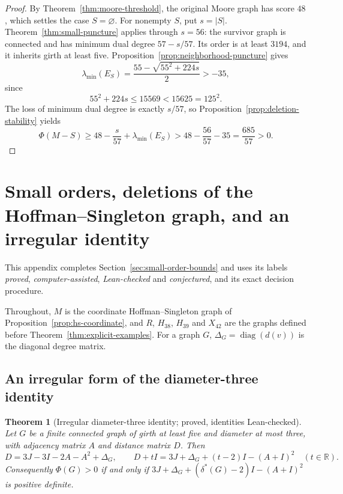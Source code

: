 \documentclass[a4paper,10pt,reqno]{amsart}
\theoremstyle{plain}
\newtheorem{theorem}{Theorem}[section]
\theoremstyle{definition}
\theoremstyle{remark}
\begin{document}
\begin{proof}
By Theorem~\ref{thm:moore-threshold}, the original Moore graph has score
\(48\), which settles the case \(S=\varnothing\).  For nonempty \(S\), put \(s=|S|\).
Theorem~\ref{thm:small-puncture} applies through \(s=56\): the survivor
graph is connected and has minimum dual degree \(57-s/57\).  Its order
is at least \(3194\), and it inherits girth at least five.
Proposition~\ref{prop:neighborhood-puncture} gives
\[
 \lambda_{\min}(E_S)
 =\frac{55-\sqrt{55^2+224s}}2>-35,
\]
since
\[
 55^2+224s\le15569<15625=125^2.
\]
The loss of minimum dual degree is exactly \(s/57\), so
Proposition~\ref{prop:deletion-stability} yields
\[
 \Phi(M-S)\ge48-\frac{s}{57}+\lambda_{\min}(E_S)
 >48-\frac{56}{57}-35=\frac{685}{57}>0.
\]
\end{proof}

\section{Small orders, deletions of the Hoffman--Singleton graph, and an irregular identity}
\label{app:small-orders}

This appendix completes Section~\ref{sec:small-order-bounds} and uses its
labels \emph{proved}, \emph{computer-assisted}, \emph{Lean-checked} and
\emph{conjectured}, and its exact decision procedure.

Throughout, \(M\) is the coordinate Hoffman--Singleton graph of
Proposition~\ref{prop:hs-coordinate}, and \(R\), \(H_{38}\), \(H_{39}\) and \(X_{42}\)
are the graphs defined before Theorem~\ref{thm:explicit-examples}. For a
graph \(G\), \(\Delta_G=\operatorname{diag}(d(v))\) is the diagonal degree
matrix.

\subsection{An irregular form of the diameter-three identity}

\begin{theorem}[Irregular diameter-three identity; proved, identities Lean-checked]
\label{thm:irregular-d3}
Let \(G\) be a finite connected graph of girth at least five and diameter at
most three, with adjacency matrix \(A\) and distance matrix \(D\). Then
\[
 D=3J-3I-2A-A^2+\Delta_G,
 \qquad
 D+tI=3J+\Delta_G+(t-2)I-(A+I)^2\quad(t\in\mathbb R).
\]
Consequently \(\Phi(G)>0\) if and only if
\(3J+\Delta_G+(\delta^*(G)-2)I-(A+I)^2\) is positive definite.
\end{theorem}
\end{document}
